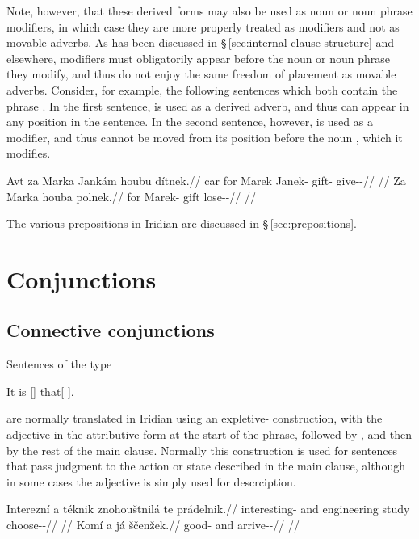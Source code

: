 Note, however, that these derived forms may also be used as noun or noun phrase
modifiers, in which case they are more properly treated as modifiers and not as
movable adverbs. As has been discussed in
\S\,\ref{sec:internal-clause-structure} and elsewhere, modifiers must
obligatorily appear before the noun or noun phrase they modify, and thus do not
enjoy the same freedom of placement as movable adverbs. Consider, for example,
the following sentences which both contain the phrase . In the first sentence,  is used as a derived
adverb, and thus can appear in any position in the sentence. In the second
sentence, however,  is used as a modifier, and thus cannot be
moved from its position before the noun , which it modifies.

\pex
	\a\begingl
	\gla Avt za Marka Jankám houbu dítnek.//
	\glb car for Marek Janek-\Agt{} gift-\Ins{} give-\Pv{}-\Pf{}//
	\glft {}//
	\endgl
	\a\begingl 
	\gla Za Marka houba polnek.//
	\glb for Marek-\Acc{} gift lose-\Pv{}-\Pf{}//
	\glft {}//
	\endgl
\xe

The various prepositions in Iridian are discussed in \S\,\ref{sec:prepositions}.

\section{Conjunctions}
\label{sec:conj}

\subsection{Connective conjunctions}\label{sec:conn-conj}

Sentences of the type

\ex
It is [] that[ ].
\xe

are normally translated in Iridian using an expletive- construction, with the adjective in the attributive form at the start of the phrase, followed by , and then by the rest of the main clause. Normally this construction is used for sentences that pass judgment to the action or state described in the main clause, although in some cases the adjective is simply used for descrciption.

\pex
\begingl
    \gla Interezní a téknik znohouštnilá te prádelnik.//
    \glb interesting-\Att{} and engineering study  choose-\Pv{}-\Pf{}//
    \glft {}//
\endgl
\xe
\pex
\begingl
    \gla Komí a já ščenžek.//
    \glb good-\Att{} and \Second{}\Sg{} arrive-\Av{}-\Pf{}//
    \glft {}//
\endgl
\xe

